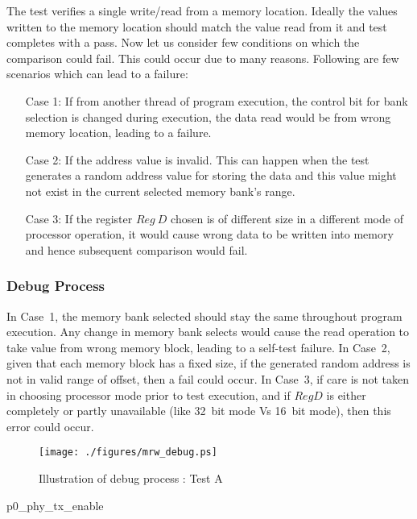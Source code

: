The test verifies a single write/read from a memory location. Ideally the values written to the memory location should match the value read from it and test completes with a pass. Now let us consider few conditions on which the comparison could fail. This could occur due to many reasons. Following are few scenarios which can lead to a failure:
\begin{itemize}
\item [Case 1:] If from another thread of program execution, the control bit for bank selection is changed during execution, the data read would be from wrong memory location, leading to a failure. \label{mrw:case1}

\item [Case 2:] If the address value is invalid. This can happen when the test generates a random address value for storing the data and this value might not exist in the current selected memory bank's range. \label{mrw:case2}

\item [Case 3:] If the register $Reg~D$ chosen is of different  size in a different mode of processor operation, it would cause wrong data to be written into memory and hence subsequent comparison would  fail. \label{mrw:case3}
\end{itemize}

\subsubsection{Debug Process}
In Case~1, the memory bank selected should stay the same throughout program execution. Any change in memory bank selects would cause the read operation to take value from wrong memory block, leading to a self-test failure. 
In Case~2, given that each memory block has a fixed size, if the generated random address is not in valid range of offset, then a fail could occur. 
In Case~3, if care is not taken in choosing processor mode prior to test execution, and if $Reg D$ is either completely or partly unavailable (like 32~bit mode Vs 16~bit mode), then this error could occur.

\begin{figure}[h]
\centering

\texttt{[image: ./figures/mrw\_debug.ps]}
\caption{Illustration of debug process : Test A} 
\label{fig:mrw_debug.ps}
\end{figure}p0_phy_tx_enable

